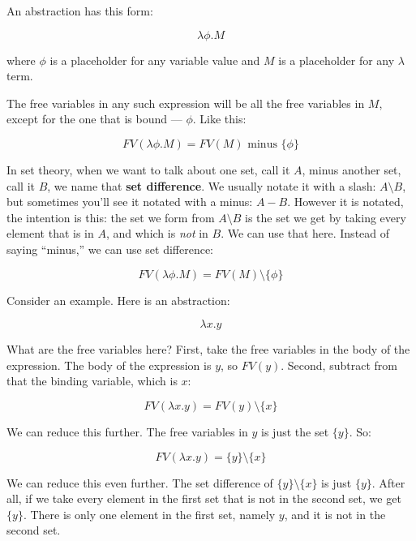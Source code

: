 \documentclass{book}
\numberwithin{equation}{chapter}
\newcommand{\vocab}{\textbf}
\begin{document}
An abstraction has this form:

\begin{equation}
\lambda \phi.M
\end{equation}

\noindent
where $\phi$ is a placeholder for any variable value and $M$ is a placeholder for any $\lambda$ term.

The free variables in any such expression will be all the free variables in $M$, except for the one that is bound --- $\phi$. Like this:

\begin{equation}
FV(\lambda \phi.M) = FV(M) \text{ minus } \{ \phi \}
\end{equation}

\noindent
In set theory, when we want to talk about one set, call it $A$, minus another set, call it $B$, we name that \vocab{set difference}. We usually notate it with a slash: $A \setminus B$, but sometimes you'll see it notated with a minus: $A - B$. However it is notated, the intention is this: the set we form from $A \setminus B$ is the set we get by taking every element that is in $A$, and which is \textit{not} in $B$. We can use that here. Instead of saying ``minus,'' we can use set difference:

\begin{equation}
FV(\lambda \phi.M) = FV(M) \setminus \{ \phi \}
\end{equation}

\noindent
Consider an example. Here is an abstraction:

\begin{equation}
\lambda x.y
\end{equation}

\noindent
What are the free variables here? First, take the free variables in the body of the expression. The body of the expression is $y$, so $FV(y)$. Second, subtract from that the binding variable, which is $x$:

\begin{equation}
FV(\lambda x.y) = FV(y) \setminus \{ x \}
\end{equation}

\noindent
We can reduce this further. The free variables in $y$ is just the set $\{ y \}$. So:

\begin{equation}
FV(\lambda x.y) = \{ y \} \setminus \{ x \}
\end{equation}

\noindent
We can reduce this even further. The set difference of $\{ y \} \setminus \{ x \}$ is just $\{ y \}$. After all, if we take every element in the first set that is not in the second set, we get $\{ y \}$. There is only one element in the first set, namely $y$, and it is not in the second set.
\end{document}
